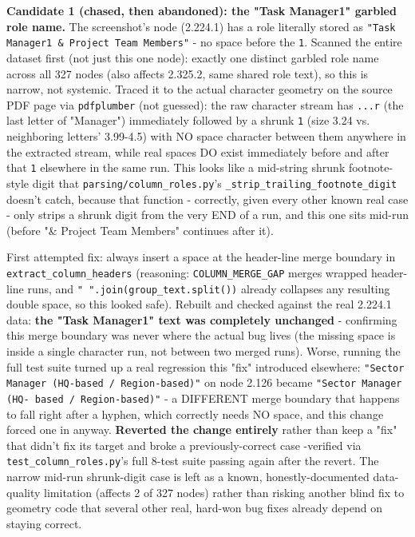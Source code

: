 \textbf{Candidate 1 (chased, then abandoned): the "Task Manager1" garbled role name.} The screenshot's node (2.224.1) has a role literally stored as \texttt{"Task Manager1 \& Project Team Members"} - no space before the \texttt{1}. Scanned the entire dataset first (not just this one node): exactly one distinct garbled role name across all 327 nodes (also affects 2.325.2, same shared role text), so this is narrow, not systemic. Traced it to the actual character geometry on the source PDF page via \texttt{pdfplumber} (not guessed): the raw character stream has \texttt{...r} (the last letter of "Manager") immediately followed by a shrunk \texttt{1} (size 3.24 vs. neighboring letters' 3.99-4.5) with NO space character between them anywhere in the extracted stream, while real spaces DO exist immediately before and after that \texttt{1} elsewhere in the same run. This looks like a mid-string shrunk footnote-style digit that \texttt{parsing/\allowbreak{}column\_\allowbreak{}roles.py}'s \texttt{\_\allowbreak{}strip\_\allowbreak{}trailing\_\allowbreak{}footnote\_\allowbreak{}digit} doesn't catch, because that function - correctly, given every other known real case - only strips a shrunk digit from the very END of a run, and this one sits mid-run (before "\& Project Team Members" continues after it).

First attempted fix: always insert a space at the header-line merge boundary in \texttt{extract\_\allowbreak{}column\_\allowbreak{}headers} (reasoning: \texttt{COLUMN\_\allowbreak{}MERGE\_\allowbreak{}GAP} merges wrapped header-line runs, and \texttt{" ".join(group\_\allowbreak{}text.split())} already collapses any resulting double space, so this looked safe). Rebuilt and checked against the real 2.224.1 data: \textbf{the "Task Manager1" text was completely unchanged} - confirming this merge boundary was never where the actual bug lives (the missing space is inside a single character run, not between two merged runs). Worse, running the full test suite turned up a real regression this "fix" introduced elsewhere: \texttt{"Sector Manager (HQ-based /\allowbreak{} Region-based)"} on node 2.126 became \texttt{"Sector Manager (HQ- based /\allowbreak{} Region-based)"} - a DIFFERENT merge boundary that happens to fall right after a hyphen, which correctly needs NO space, and this change forced one in anyway. \textbf{Reverted the change entirely} rather than keep a "fix" that didn't fix its target and broke a previously-correct case -verified via \texttt{test\_\allowbreak{}column\_\allowbreak{}roles.py}'s full 8-test suite passing again after the revert. The narrow mid-run shrunk-digit case is left as a known, honestly-documented data-quality limitation (affects 2 of 327 nodes) rather than risking another blind fix to geometry code that several other real, hard-won bug fixes already depend on staying correct.

